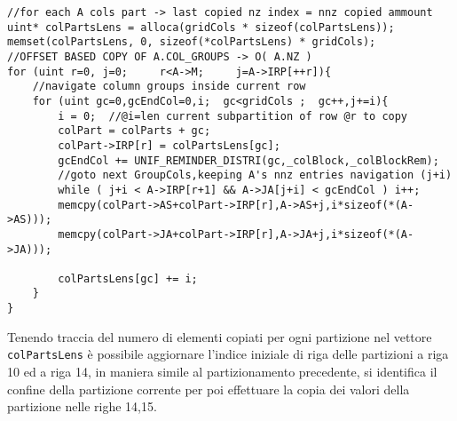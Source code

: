 \begin{lstlisting}
//for each A cols part -> last copied nz index = nnz copied ammount
uint* colPartsLens = alloca(gridCols * sizeof(colPartsLens));
memset(colPartsLens, 0, sizeof(*colPartsLens) * gridCols);
//OFFSET BASED COPY OF A.COL_GROUPS -> O( A.NZ )
for (uint r=0, j=0;     r<A->M;     j=A->IRP[++r]){
    //navigate column groups inside current row
    for (uint gc=0,gcEndCol=0,i;  gc<gridCols ;  gc++,j+=i){
        i = 0;  //@i=len current subpartition of row @r to copy
        colPart = colParts + gc;
        colPart->IRP[r] = colPartsLens[gc];
        gcEndCol += UNIF_REMINDER_DISTRI(gc,_colBlock,_colBlockRem);
        //goto next GroupCols,keeping A's nnz entries navigation (j+i)
        while ( j+i < A->IRP[r+1] && A->JA[j+i] < gcEndCol ) i++;
        memcpy(colPart->AS+colPart->IRP[r],A->AS+j,i*sizeof(*(A->AS)));
        memcpy(colPart->JA+colPart->IRP[r],A->JA+j,i*sizeof(*(A->JA)));
        
        colPartsLens[gc] += i;
    }
}
\end{lstlisting}

Tenendo traccia del numero di elementi \nnz copiati per ogni partizione nel
vettore \verb|colPartsLens| è possibile aggiornare l'indice iniziale di riga 
delle partizioni a riga 10 ed a riga 14, in maniera simile al partizionamento
precedente, si identifica il confine della partizione corrente per poi
effettuare la copia dei valori \nnz della partizione nelle righe 14,15.\\ %

